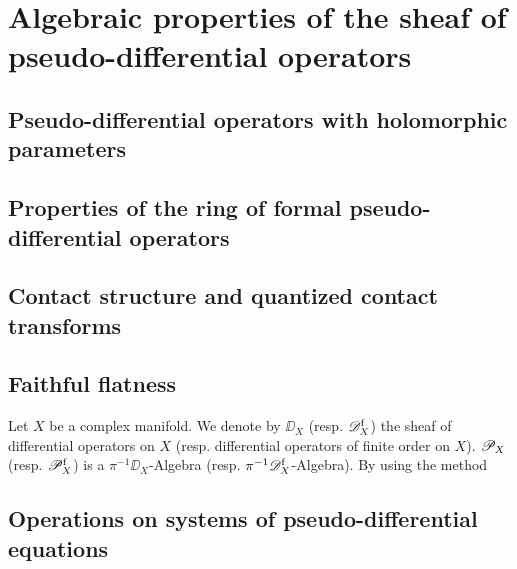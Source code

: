 \section{Algebraic properties of the sheaf of pseudo-differential operators}


\subsection{Pseudo-differential operators with holomorphic parameters}


\subsection{Properties of the ring of formal pseudo-differential operators}


\subsection{Contact structure and quantized contact transforms}


\subsection{Faithful flatness}


\begin{rem}
    Let $X$ be a complex manifold. We denote by $\DD_X$ (resp. ${\mathscr{D}}^{\mathrm{f}}_X$) 
    the sheaf of differential operators on $X$ (resp. differential 
    operators of finite order on $X$). 
    $\mathscr{P}_X$ (resp. ${\mathscr{P}}^{\mathrm{f}}_X$) is a $\pi^{-1}\DD_X$-Algebra 
    (resp. $\pi^{-1}{\mathscr{D}}^{\mathrm{f}}_X$-Algebra). 
    By using the method 
\end{rem}

\subsection{Operations on systems of pseudo-differential equations}


